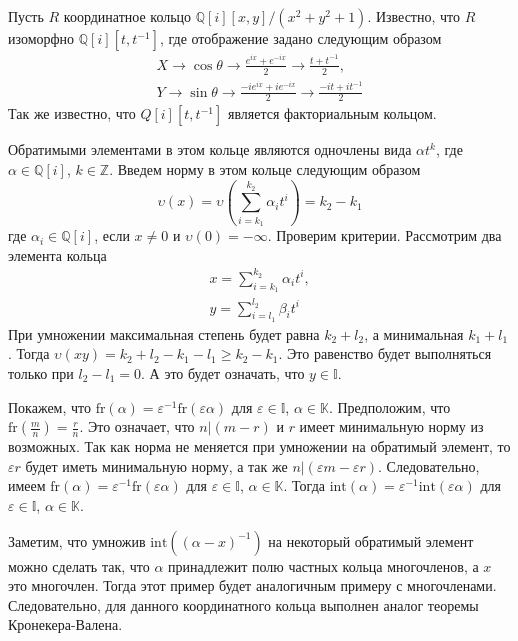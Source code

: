 \documentclass[_00_dissertation.tex]{subfiles}
\begin{document}
\begin{example}\label{example:coordinate_ring_of_circle}
    Пусть $R$ координатное кольцо $\mathbb{Q}[i][x, y]/(x^2 + y^2 + 1)$.
    Известно, что $R$ изоморфно $\mathbb{Q}[i][t,  t^{-1}]$, где отображение задано следующим образом
    \begin{equation*}
        \begin{split}
            X \to \cos \theta \to \frac{e^{ix} + e^{-ix}}{2} \to \frac{t + t^{-1}}{2},\\
            Y \to \sin \theta \to \frac{-ie^{ix} + ie^{-ix}}{2} \to \frac{-it + it^{-1}}{2}
        \end{split}
    \end{equation*}
    Так же известно, что $Q[i][t, t^{-1}]$ является факториальным кольцом.
    
    Обратимыми элементами в этом кольце  являются одночлены вида $\alpha t^k$, где $\alpha\in\mathbb{Q}[i]$, $k\in\mathbb{Z}$.
    Введем норму в этом кольце следующим образом
    \begin{equation*}
        \upsilon(x) = \upsilon\left(
            \sum_{i=k_1}^{k_2} \alpha_i t^i
        \right) = k_2 - k_1
    \end{equation*}
    где $\alpha_i\in\mathbb{Q}[i]$, если $x \neq 0$ и $\upsilon(0) = -\infty$.
    Проверим критерии.
    Рассмотрим два элемента кольца
    \begin{equation*}
        \begin{split}
            x = \sum_{i=k_1}^{k_2} \alpha_i t^i,\\
            y = \sum_{i=l_1}^{l_2} \beta_i t^i
        \end{split}
    \end{equation*}
    При  умножении максимальная степень будет равна $k_2 + l_2$, а минимальная $k_1 + l_1$.
    Тогда $\upsilon(xy) = k_2 + l_2 - k_1 - l_1 \ge k_2 - k_1$.
    Это равенство будет выполняться только при $l_2 - l_1 = 0$.
    А это будет означать, что $y\in\mathbb{I}$.
    
    Покажем, что $\textrm{fr}(\alpha) = \varepsilon^{-1}\textrm{fr}(\varepsilon\alpha)$ для $\varepsilon\in\mathbb{I}$, $\alpha\in\mathbb{K}$.
    Предположим, что $\textrm{fr}\left(\frac{m}{n}\right) = \frac{r}{n}$.
    Это означает, что $n | (m-r)$ и $r$ имеет минимальную норму из возможных.
    Так как норма не меняется при умножении на обратимый элемент, то $\varepsilon r$ будет иметь минимальную норму, а так же $n | (\varepsilon m - \varepsilon r)$.
    Следовательно, имеем $\textrm{fr}(\alpha) = \varepsilon^{-1}\textrm{fr}(\varepsilon\alpha)$ для $\varepsilon\in\mathbb{I}$, $\alpha\in\mathbb{K}$.
    Тогда $\textrm{int}(\alpha) = \varepsilon^{-1}\textrm{int}(\varepsilon\alpha)$ для $\varepsilon\in\mathbb{I}$, $\alpha\in\mathbb{K}$.
    
    Заметим, что умножив $\textrm{int}((\alpha-x)^{-1})$ на некоторый обратимый элемент можно сделать так, что $\alpha$ принадлежит полю частных кольца многочленов, а $x$ это многочлен.
    Тогда этот пример будет аналогичным примеру с многочленами.
    Следовательно, для данного координатного кольца выполнен аналог теоремы Кронекера-Валена.
\end{example}
\end{document}

